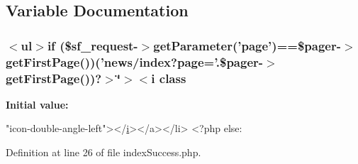 \subsection{Variable Documentation}
\hypertarget{frontend_2modules_2news_2templates_2index_success_8php_aaed49dff7a3909bacca6a7e3768ef0a7}{
\subsubsection[{(\$sf\-\_\-request-\/$>$get\-Parameter('page')==\$pager-\/$>$get\-First\-Page())}]{\setlength{\rightskip}{0pt plus 5cm}$<$ul$>${\bf if} (\$sf\-\_\-request-\/$>$get\-Parameter('page')==\$pager-\/$>$get\-First\-Page())('news/index?page='.\$pager-\/$>$get\-First\-Page())?$>$\char`\"{}$>$$<$i {\bf class}}}\label{frontend_2modules_2news_2templates_2index_success_8php_aaed49dff7a3909bacca6a7e3768ef0a7}
{\bfseries Initial value\-:}
\begin{DoxyCode}
\textcolor{stringliteral}{"icon-double-angle-left"}></\hyperlink{live_2modules_2partner_2templates_2__rolling_8php_a7e98b8a17c0aad30ba64d47b74e2a6c1}{i}></a></li> 
    <?php \textcolor{keywordflow}{else}:
\end{DoxyCode}


Definition at line 26 of file index\-Success.\-php.

